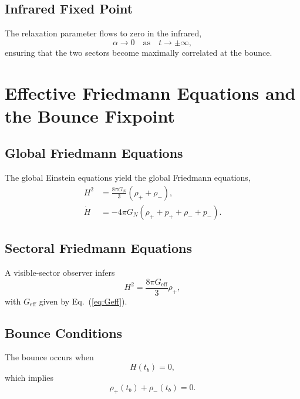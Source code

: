 \documentclass[11pt,a4paper]{article}
\begin{document}
\subsection{Infrared Fixed Point}

The relaxation parameter flows to zero in the infrared,
\begin{equation}
\alpha \to 0 \quad \text{as} \quad t \to \pm \infty,
\end{equation}
ensuring that the two sectors become maximally correlated at the bounce.

\section{Effective Friedmann Equations and the Bounce Fixpoint}

\subsection{Global Friedmann Equations}

The global Einstein equations yield the global Friedmann equations,
\begin{align}
H^2 &= \frac{8\pi G_N}{3} (\rho_+ + \rho_-), \\
\dot{H} &= -4\pi G_N (\rho_+ + p_+ + \rho_- + p_-).
\end{align}

\subsection{Sectoral Friedmann Equations}

A visible-sector observer infers
\begin{equation}
H^2 = \frac{8\pi G_{\mathrm{eff}}}{3} \rho_+,
\end{equation}
with $G_{\mathrm{eff}}$ given by Eq.~(\ref{eq:Geff}).

\subsection{Bounce Conditions}

The bounce occurs when
\begin{equation}
H(t_b) = 0,
\end{equation}
which implies
\begin{equation}
\rho_+(t_b) + \rho_-(t_b) = 0.
\end{equation}
\end{document}
